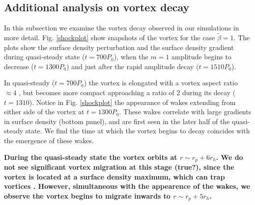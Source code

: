 





\subsection{Additional analysis on vortex decay}
In this subsection we examine the vortex decay observed in our
simulations in more detail. Fig. \ref{shockplot} show snapshots
of the vortex for the case $\tilde{\beta}=1$. The plots show the surface
density perturbation and the surface density gradient during
quasi-steady state ($t=700P_0$), when the $m=1$ amplitude begins to
decrease ($t=1300P_0$) and just after the rapid amplitude decay
($t=1510P_0$). 

In quasi-steady ($t=700P_0$) the vortex is elongated with a vortex aspect ratio $ \approx 4$
, but becomes more compact approaching a ratio of 2 during its decay ($t=1310$).   
Notice in Fig. \ref{shockplot} the appearance of wakes extending from
either side of the vortex at $t=1300P_0$. These 
wakes correlate with large gradients in surface density (bottom
panel), and are first seen in the later half of the quasi-steady
state. We find the time at which 
the vortex begins to decay coincides with the emergence of these
wakes. %

{\bf During the quasi-steady state the vortex 
  orbits at $r\sim r_p+6r_h$. We do not see significant
  vortex migration at this stage (true?), since the vortex is located at a
  surface density maximum, which can trap vortices
  \citep{paardekooper10}. However, simultaneous with the
  appearence of the wakes, we observe the vortex begins to migrate 
  inwards to $r\sim r_p+5r_h$. 
  } 

